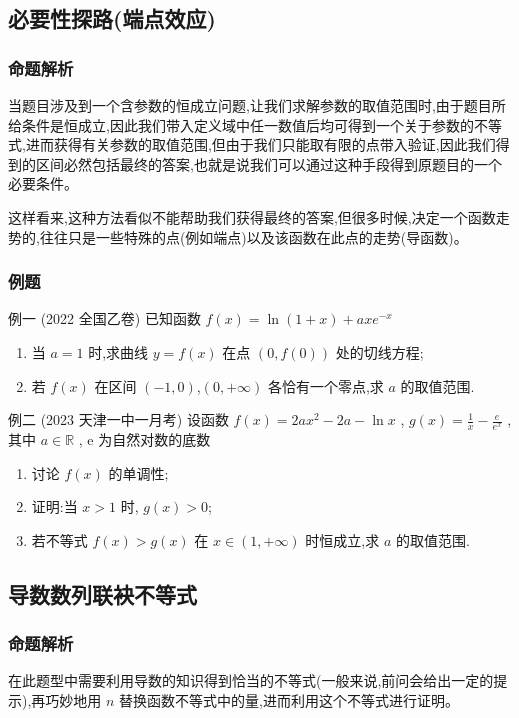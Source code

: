 \documentclass{article}
\begin{document}
\newpage
\subsection{必要性探路(端点效应)}
\subsubsection{命题解析}

当题目涉及到一个含参数的恒成立问题,让我们求解参数的取值范围时,由于题目所给条件是恒成立,因此我们带入定义域中任一数值后均可得到一个关于参数的不等式,进而获得有关参数的取值范围,但由于我们只能取有限的点带入验证,因此我们得到的区间必然包括最终的答案,也就是说我们可以通过这种手段得到原题目的一个必要条件。

这样看来,这种方法看似不能帮助我们获得最终的答案,但很多时候,决定一个函数走势的,往往只是一些特殊的点(例如端点)以及该函数在此点的走势(导函数)。

\subsubsection{例题}


例一 (2022 全国乙卷) 已知函数 $f(x)=\ln (1+x)+a x e^{-x}$
\begin{enumerate}
\item[(1)] 当 $a=1$ 时,求曲线 $y=f(x)$ 在点 $(0, f(0))$ 处的切线方程;
\item[(2)] 若 $f(x)$ 在区间 $(-1,0)$,$(0,+\infty)$ 各恰有一个零点,求 $a$ 的取值范围.
\end{enumerate}
\vspace{20\baselineskip}

例二 (2023 天津一中一月考) 设函数 $f(x)=2 a x^2-2 a-\ln x$ , $g(x)=\frac{1}{x}-\frac{e}{e^x}$ ,其中 $a \in \mathbb{R}$ , e 为自然对数的底数
\begin{enumerate}
\item[(I)] 讨论 $f(x)$ 的单调性;
\item[(II)] 证明:当 $x>1$ 时, $g(x)>0$;
\item[(III)] 若不等式 $f(x)>g(x)$ 在 $x \in(1,+\infty)$ 时恒成立,求 $a$ 的取值范围.
\end{enumerate}
\vspace{20\baselineskip}

\newpage
\subsection{导数数列联袂不等式}
\subsubsection{命题解析}
在此题型中需要利用导数的知识得到恰当的不等式(一般来说,前问会给出一定的提示),再巧妙地用 $n$ 替换函数不等式中的量,进而利用这个不等式进行证明。
\end{document}

